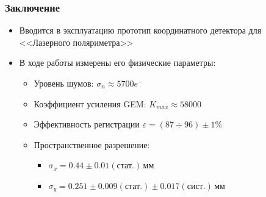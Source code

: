 \documentclass[14pt]{beamer}
\newcommand{\backupbegin}{
	\newcounter{finalframe}
	\setcounter{finalframe}{\value{framenumber}}
}
\begin{document}
\begin{frame}[t]
\frametitle{Заключение}
\begin{itemize}
	\item Вводится в эксплуатацию прототип координатного детектора для  <<Лазерного поляриметра>>
	\item В ходе работы измерены его физические параметры: 
	\begin{itemize}
		\setlength\itemsep{0.5em}
		\item Уровень шумов: $\sigma_{n} \approx 5700 e^{-}$
		\item Коэффициент усиления GEM: $K_{max} \approx 58000$
		\item Эффективность регистрации $\varepsilon = (87 \div 96) \pm 1 \%$
		\item Пространственное разрешение:
		\begin{itemize}
			\setlength\itemsep{0.5em}
			\item $\sigma_x = 0.44\pm0.01(\text{стат.})$\,мм
			\item $\sigma_y = 0.251\pm0.009(\text{стат.})\pm0.017(\text{сист.})$\,мм
		\end{itemize}
	\end{itemize}
\end{itemize}
\end{frame}

\begin{frame}
\maketitle
\end{frame}
\backupbegin
\end{document}
